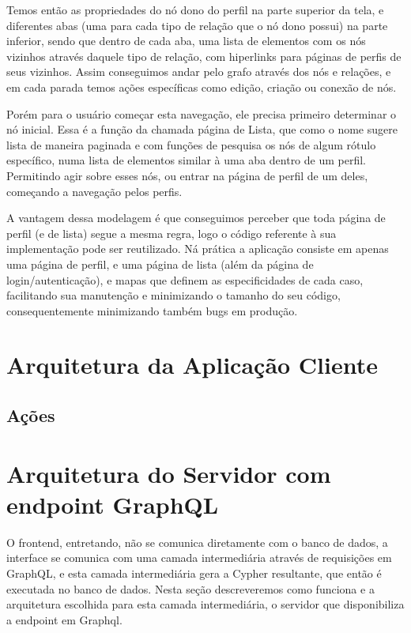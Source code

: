 Temos então as propriedades do nó dono do perfil na parte superior da tela, e diferentes abas (uma para cada tipo de relação que o nó dono possui) na parte inferior, sendo que dentro de cada aba, uma lista de elementos com os nós vizinhos através daquele tipo de relação, com hiperlinks para páginas de perfis de seus vizinhos. Assim conseguimos andar pelo grafo através dos nós e relações, e em cada parada temos ações específicas como edição, criação ou conexão de nós.

Porém para o usuário começar esta navegação, ele precisa primeiro determinar o nó inicial. Essa é a função da chamada página de Lista, que como o nome sugere lista de maneira paginada e com funções de pesquisa os nós de algum rótulo específico, numa lista de elementos similar à uma aba dentro de um perfil. Permitindo agir sobre esses nós, ou entrar na página de perfil de um deles, começando a navegação pelos perfis.

A vantagem dessa modelagem é que conseguimos perceber que toda página de perfil (e de lista) segue a mesma regra, logo o código referente à sua implementação pode ser reutilizado. Ná prática a aplicação consiste em apenas uma página de perfil, e uma página de lista (além da página de login/autenticação), e mapas que definem as especificidades de cada caso, facilitando sua manutenção e minimizando o tamanho do seu código, consequentemente minimizando também bugs em produção.

\section{Arquitetura da Aplicação Cliente}

\subsection{Ações}

\section{Arquitetura do Servidor com endpoint GraphQL}

O frontend, entretando, não se comunica diretamente com o banco de dados, a interface se comunica com uma camada intermediária através de requisições em GraphQL, e esta camada intermediária gera a Cypher resultante, que então é executada no banco de dados. Nesta seção descreveremos como funciona e a arquitetura escolhida para esta camada intermediária, o servidor que disponibiliza a endpoint em Graphql.

